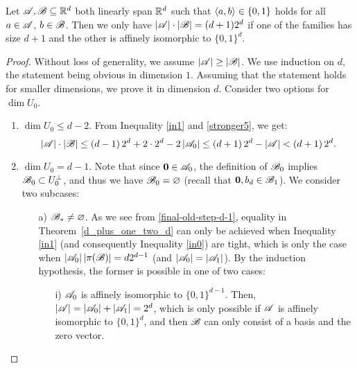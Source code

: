 \begin{theorem}\label{uniq}
    Let ${\mathscr{A}},{\mathscr{B}} \subseteq {\mathbb{R}}^d$ both linearly span ${\mathbb{R}}^d$ such that $\langle a, b\rangle \in \{0,1\}$ holds for all $a \in {\mathscr{A}}$, $b \in {\mathscr{B}}$. Then we only have $|{\mathscr{A}}| \cdot |{\mathscr{B}}| = (d+1) 2^d$ if one of the families has size $d+1$ and the other is affinely isomorphic to $\{0,1\}^d$.
\end{theorem}
\begin{proof}
     Without loss of generality, we assume $\left|{\mathscr{A}}\right| \geq \left|{\mathscr{B}}\right|$. We  use induction on $d$, the statement being obvious in dimension $1$. Assuming that the statement holds for smaller dimensions, we prove it in dimension $d$. Consider two options for $\operatorname{dim}U_0$.
    \begin{enumerate}
        \item $\operatorname{dim}U_0 \leq d-2$. From Inequality \ref{in1} and \eqref{stronger5}, we get:
        \begin{equation*}
            \left|{\mathscr{A}}\right| \cdot\left|{\mathscr{B}}\right| \leq 
            \left(d - 1\right) 2^d + 2\cdot2^d - 2\left|{\mathscr{A}}_0\right| \leq
            \left(d + 1\right) 2^d - \left|{\mathscr{A}}\right| < \left(d + 1\right) 2^d.
        \end{equation*}
        \item $\operatorname{dim}U_0 = d-1$. Note that since $\mathbf{0} \in {\mathscr{A}}_0$, the definition of ${\mathscr{B}}_0$ implies ${\mathscr{B}}_0 \subset U_0^\bot$, and thus  we have ${\mathscr{B}}_0 = \varnothing$ (recall that $\mathbf{0}, b_d \in {\mathscr{B}}_1$). We consider two subcases:
        \begin{enumerate}
            \item[a)]\label{uniqfirstcase} ${\mathscr{B}}_*\neq\varnothing$. As we see from \eqref{final-old-step-d-1}, equality in Theorem~\ref{d_plus_one_two_d} can only be achieved when %
            Inequality \ref{in1} (and consequently Inequality \ref{in0}) are tight, which is only the case when  $\left|{\mathscr{A}}_0\right|\left|\pi({\mathscr{B}})\right|=d 2^{d-1}$ (and $\left|{\mathscr{A}}_0\right|=\left|{\mathscr{A}}_1\right|$). By the induction hypothesis, the former is possible in one of two cases:
            \begin{enumerate}
                \item[i)] ${\mathscr{A}}_0$ is affinely isomorphic to $\{0,1\}^{d-1}$. Then, $\left|{\mathscr{A}}\right|=\left|{\mathscr{A}}_0\right|+\left|{\mathscr{A}}_1\right|=2^d$, which is only possible if ${\mathscr{A}}$ is affinely isomorphic to $\{0,1\}^d$, and then ${\mathscr{B}}$ can only consist of a basis and the zero vector.

\end{enumerate}
\end{enumerate}
\end{enumerate}
\end{proof}

